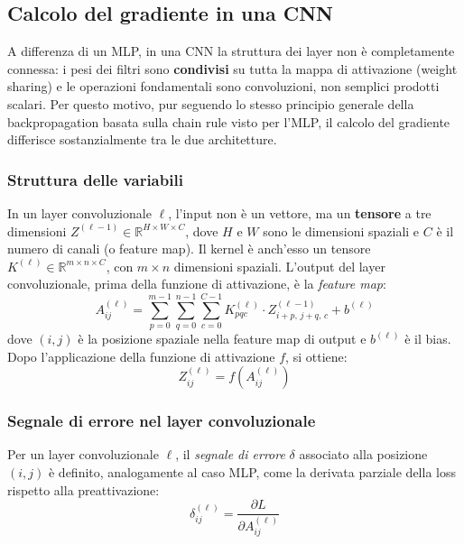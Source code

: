 \subsection{Calcolo del gradiente in una CNN}

A differenza di un MLP, in una CNN la struttura dei layer non è completamente connessa: i pesi dei filtri sono \textbf{condivisi} su tutta la mappa di attivazione (weight sharing) e le operazioni fondamentali sono convoluzioni, non semplici prodotti scalari. Per questo motivo, pur seguendo lo stesso principio generale della backpropagation basata sulla chain rule visto per l'MLP, il calcolo del gradiente differisce sostanzialmente tra le due architetture.

\subsubsection{Struttura delle variabili}

In un layer convoluzionale $\ell$, l'input non è un vettore, ma un \textbf{tensore} a tre dimensioni $Z^{(\ell-1)}\in\mathbb{R}^{H\times W\times C}$, dove $H$ e $W$ sono le dimensioni spaziali e $C$ è il numero di canali (o feature map). Il kernel è anch'esso un tensore $K^{(\ell)} \in\mathbb{R}^{m\times n\times C}$, con $m\times n$ dimensioni spaziali. L'output del layer convoluzionale, prima della funzione di attivazione, è la \emph{feature map}:
\[
A^{(\ell)}_{ij}=\sum_{p=0}^{m-1}\sum_{q=0}^{n-1}\sum_{c=0}^{C-1}K^{(\ell)}_{pqc}\cdot Z^{(\ell-1)}_{i+p,\,j+q,\,c}+b^{(\ell)}
\]
dove $(i,j)$ è la posizione spaziale nella feature map di output e $b^{(\ell)}$ è il bias. Dopo l'applicazione della funzione di attivazione $f$, si ottiene:
\[
Z^{(\ell)}_{ij}=f\!\left(A^{(\ell)}_{ij}\right)
\]

\subsubsection{Segnale di errore nel layer convoluzionale}

Per un layer convoluzionale $\ell$, il \emph{segnale di errore} $\delta$ associato alla posizione $(i,j)$ è definito, analogamente al caso MLP, come la derivata parziale della loss rispetto alla preattivazione:
\[
\delta^{(\ell)}_{ij}=\frac{\partial L}{\partial A^{(\ell)}_{ij}}
\]

